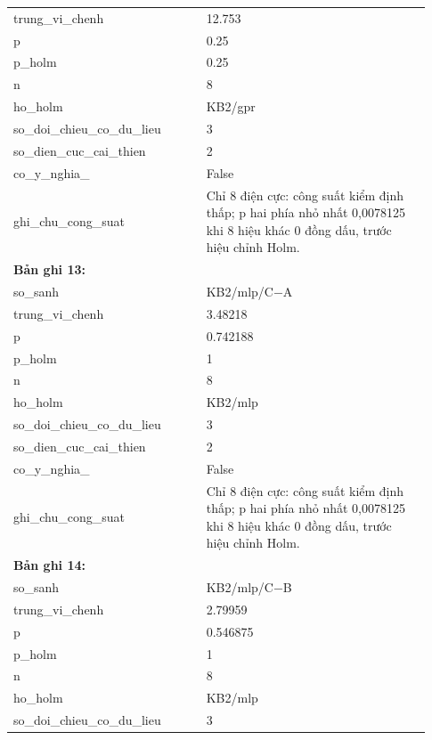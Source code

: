 \begin{longtable}{p{0.43\linewidth}p{0.50\linewidth}}
trung\_\allowbreak vi\_\allowbreak chenh & 12.753 \\
p & 0.25 \\
p\_\allowbreak holm & 0.25 \\
n & 8 \\
ho\_\allowbreak holm & KB2/gpr \\
so\_\allowbreak doi\_\allowbreak chieu\_\allowbreak co\_\allowbreak du\_\allowbreak lieu & 3 \\
so\_\allowbreak dien\_\allowbreak cuc\_\allowbreak cai\_\allowbreak thien & 2 \\
co\_\allowbreak y\_\allowbreak nghia\_\allowbreak 005 & False \\
ghi\_\allowbreak chu\_\allowbreak cong\_\allowbreak suat & Chỉ 8 điện cực: công suất kiểm định thấp; p hai phía nhỏ nhất 0,0078125 khi 8 hiệu khác 0 đồng dấu, trước hiệu chỉnh Holm. \\
\midrule
\multicolumn{2}{p{0.95\linewidth}}{\textbf{Bản ghi 13: }} \\
so\_\allowbreak sanh & KB2/mlp/C−A \\
trung\_\allowbreak vi\_\allowbreak chenh & 3.48218 \\
p & 0.742188 \\
p\_\allowbreak holm & 1 \\
n & 8 \\
ho\_\allowbreak holm & KB2/mlp \\
so\_\allowbreak doi\_\allowbreak chieu\_\allowbreak co\_\allowbreak du\_\allowbreak lieu & 3 \\
so\_\allowbreak dien\_\allowbreak cuc\_\allowbreak cai\_\allowbreak thien & 2 \\
co\_\allowbreak y\_\allowbreak nghia\_\allowbreak 005 & False \\
ghi\_\allowbreak chu\_\allowbreak cong\_\allowbreak suat & Chỉ 8 điện cực: công suất kiểm định thấp; p hai phía nhỏ nhất 0,0078125 khi 8 hiệu khác 0 đồng dấu, trước hiệu chỉnh Holm. \\
\midrule
\multicolumn{2}{p{0.95\linewidth}}{\textbf{Bản ghi 14: }} \\
so\_\allowbreak sanh & KB2/mlp/C−B \\
trung\_\allowbreak vi\_\allowbreak chenh & 2.79959 \\
p & 0.546875 \\
p\_\allowbreak holm & 1 \\
n & 8 \\
ho\_\allowbreak holm & KB2/mlp \\
so\_\allowbreak doi\_\allowbreak chieu\_\allowbreak co\_\allowbreak du\_\allowbreak lieu & 3 \\

\end{longtable}
